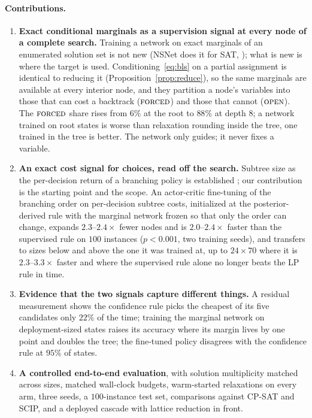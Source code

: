 \documentclass[final,5p,times,twocolumn]{elsarticle}
\newcommand{\FORCED}{\textsc{forced}}
\newcommand{\FREE}{\textsc{open}}
\begin{document}
\paragraph{Contributions.}
\begin{enumerate}
\item \textbf{Exact conditional marginals as a supervision signal at every node of a complete search.} Training a network on exact marginals of an enumerated solution set is not new (NSNet does it for SAT, \citealp{li2022nsnet}); what is new is where the target is used. Conditioning~\eqref{eq:bls} on a partial assignment is identical to reducing it (Proposition~\ref{prop:reduce}), so the same marginals are available at every interior node, and they partition a node's variables into those that can cost a backtrack ($\FORCED$) and those that cannot ($\FREE$). The $\FORCED$ share rises from $6\%$ at the root to $88\%$ at depth $8$; a network trained on root states is worse than relaxation rounding inside the tree, one trained in the tree is better. The network only guides; it never fixes a variable.
\item \textbf{An exact cost signal for choices, read off the search.} Subtree size as the per-decision return of a branching policy is established \citep{etheve2020reinforcement,scavuzzo2022learning}; our contribution is the starting point and the scope. An actor-critic fine-tuning of the branching order on per-decision subtree costs, initialized at the posterior-derived rule with the marginal network frozen so that only the order can change, expands $2.3$--$2.4\times$ fewer nodes and is $2.0$--$2.4\times$ faster than the supervised rule on $100$ instances ($p<0.001$, two training seeds), and transfers to sizes below and above the one it was trained at, up to $24\times70$ where it is $2.3$--$3.3\times$ faster and where the supervised rule alone no longer beats the LP rule in time.
\item \textbf{Evidence that the two signals capture different things.} A residual measurement shows the confidence rule picks the cheapest of its five candidates only $22\%$ of the time; training the marginal network on deployment-sized states raises its accuracy where its margin lives by one point and doubles the tree; the fine-tuned policy disagrees with the confidence rule at $95\%$ of states.
\item \textbf{A controlled end-to-end evaluation}, with solution multiplicity matched across sizes, matched wall-clock budgets, warm-started relaxations on every arm, three seeds, a $100$-instance test set, comparisons against CP-SAT and SCIP, and a deployed cascade with lattice reduction in front.
\end{enumerate}
\end{document}
